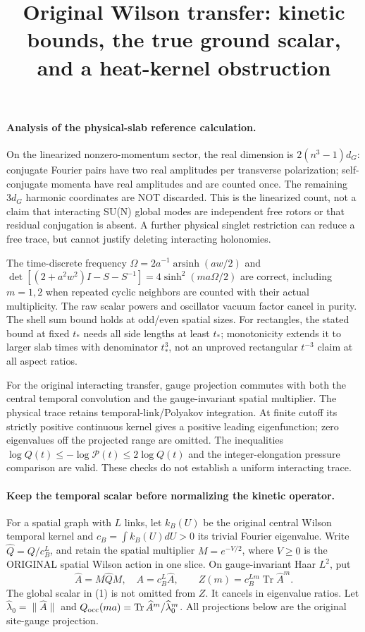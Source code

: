 \documentclass[11pt]{article}
\title{Original Wilson transfer: kinetic bounds, the true ground scalar, and a heat-kernel obstruction}\author{}\date{}
\begin{document}
\maketitle
\paragraph{Analysis of the physical-slab reference calculation.}
On the linearized
nonzero-momentum sector, the real dimension is $2(n^3-1)d_G$: conjugate Fourier
pairs have two real amplitudes per transverse polarization; self-conjugate
momenta have real amplitudes and are counted once. The remaining $3d_G$ harmonic
coordinates are NOT discarded. This is the linearized count, not a claim that
interacting SU(N) global modes are independent free rotors or that residual
conjugation is absent. A further physical singlet restriction can reduce a free
trace, but cannot justify deleting interacting holonomies.

The time-discrete frequency $\Omega=2a^{-1}\operatorname{arsinh}(aw/2)$ and
$\det[(2+a^2w^2)I-S-S^{-1}]=4\sinh^2(ma\Omega/2)$ are correct, including $m=1,2$
when repeated cyclic neighbors are counted with their actual multiplicity.
The raw scalar powers and oscillator vacuum factor cancel in purity. The shell
sum bound holds at odd/even spatial sizes. For rectangles, the stated bound at
fixed $t_*$ needs all side lengths at least $t_*$; monotonicity extends it to
larger slab times with denominator $t_*^3$, not an unproved rectangular $t^{-3}$
claim at all aspect ratios.

For the original interacting transfer, gauge projection commutes with both the
central temporal convolution and the gauge-invariant spatial multiplier. The
physical trace retains temporal-link/Polyakov integration. At finite cutoff its
strictly positive continuous kernel gives a positive leading eigenfunction;
zero eigenvalues off the projected range are omitted. The inequalities
$\log Q(t)\le-\log\mathcal P(t)\le2\log Q(t)$ and the integer-elongation pressure
comparison are valid. These checks do not establish a uniform interacting trace.

\paragraph{Keep the temporal scalar before normalizing the kinetic operator.}
For a spatial graph with $L$ links, let $k_B(U)$ be the original central Wilson
temporal kernel and $c_B=\int k_B(U)dU>0$ its trivial Fourier eigenvalue.
Write $\widehat Q=Q/c_B^L$, and retain the spatial multiplier
$M=e^{-V/2}$, where $V\ge0$ is the ORIGINAL spatial Wilson action in one slice.
On gauge-invariant Haar $L^2$, put
\[
 \widehat A=M\widehat Q M,\quad A=c_B^L\widehat A,
 \qquad Z(m)=c_B^{Lm}\operatorname{Tr}\widehat A^m.       \tag{1}
\]
The global scalar in (1) is not omitted from $Z$. It cancels in eigenvalue ratios.
Let $\widehat\lambda_0=\|\widehat A\|$ and
$Q_{\rm occ}(ma)=\operatorname{Tr}\widehat A^m/\widehat\lambda_0^m$.
All projections below are the original site-gauge projection.
\end{document}
